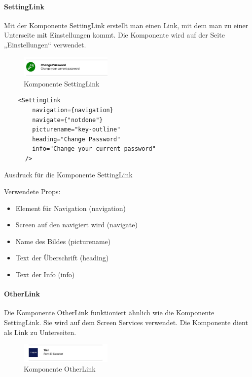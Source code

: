 \paragraph{SettingLink}Mit der Komponente SettingLink erstellt man einen Link, mit dem man zu einer Unterseite mit Einstellungen kommt. Die Komponente wird auf der Seite „Einstellungen“ verwendet.

\begin{figure}[H]
  \centering
  \includegraphics[width=0.4\textwidth]{images/app-screenshots/settinglink.png}
  \caption{Komponente SettingLink}
  \label{fig:settinglink}
\end{figure}


\begin{listing}[H]
  \begin{verbatim}
    <SettingLink
        navigation={navigation}
        navigate={"notdone"}
        picturename="key-outline"
        heading="Change Password"
        info="Change your current password"
      />
 \end{verbatim}
  \caption{Ausdruck für die Komponente SettingLink}
  \label{lst:jsxsettinglink}
\end{listing}
Verwendete Props:
\begin{itemize}
  \item Element für Navigation (navigation)
  \item Screen auf den navigiert wird (navigate)
  \item Name des Bildes (picturename)
  \item Text der Überschrift (heading)
  \item Text der Info (info)
\end{itemize}


\paragraph{OtherLink}Die Komponente OtherLink funktioniert ähnlich wie die Komponente SettingLink. Sie wird auf dem Screen Services verwendet. Die Komponente dient als Link zu Unterseiten.

\begin{figure}[H]
  \centering
  \includegraphics[width=0.4\textwidth]{images/app-screenshots/otherlink.png}
  \caption{Komponente OtherLink}
  \label{fig:otherlink}
\end{figure}

